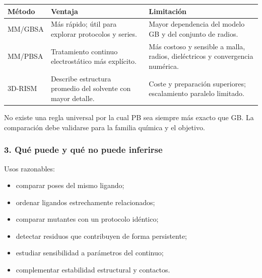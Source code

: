 \documentclass[
  spanish,
  11pt,
  a4paper]{article}
\newcounter{none} %
\providecommand{\tightlist}{%
  \setlength{\itemsep}{0pt}\setlength{\parskip}{0pt}}
\begin{document}
{\def\LTcaptype{none} %
\begin{longtable}[]{@{}
  >{\raggedright\arraybackslash}p{}
  >{\raggedright\arraybackslash}p{}
  >{\raggedright\arraybackslash}p{}@{}}
\toprule\noalign{}
\begin{minipage}[b]{\linewidth}\raggedright
Método
\end{minipage} & \begin{minipage}[b]{\linewidth}\raggedright
Ventaja
\end{minipage} & \begin{minipage}[b]{\linewidth}\raggedright
Limitación
\end{minipage} \\
\midrule\noalign{}
\endhead
\bottomrule\noalign{}
\endlastfoot
MM/GBSA & Más rápido; útil para explorar protocolos y series. & Mayor
dependencia del modelo GB y del conjunto de radios. \\
MM/PBSA & Tratamiento continuo electrostático más explícito. & Más
costoso y sensible a malla, radios, dieléctricos y convergencia
numérica. \\
3D-RISM & Describe estructura promedio del solvente con mayor detalle. &
Coste y preparación superiores; escalamiento paralelo limitado. \\
\end{longtable}
}

No existe una regla universal por la cual PB sea siempre más exacto que
GB. La comparación debe validarse para la familia química y el objetivo.

\subsubsection{3. Qué puede y qué no puede
inferirse}\label{quuxe9-puede-y-quuxe9-no-puede-inferirse}

Usos razonables:

\begin{itemize}
\tightlist
\item
  comparar poses del mismo ligando;
\item
  ordenar ligandos estrechamente relacionados;
\item
  comparar mutantes con un protocolo idéntico;
\item
  detectar residuos que contribuyen de forma persistente;
\item
  estudiar sensibilidad a parámetros del continuo;
\item
  complementar estabilidad estructural y contactos.
\end{itemize}
\end{document}
